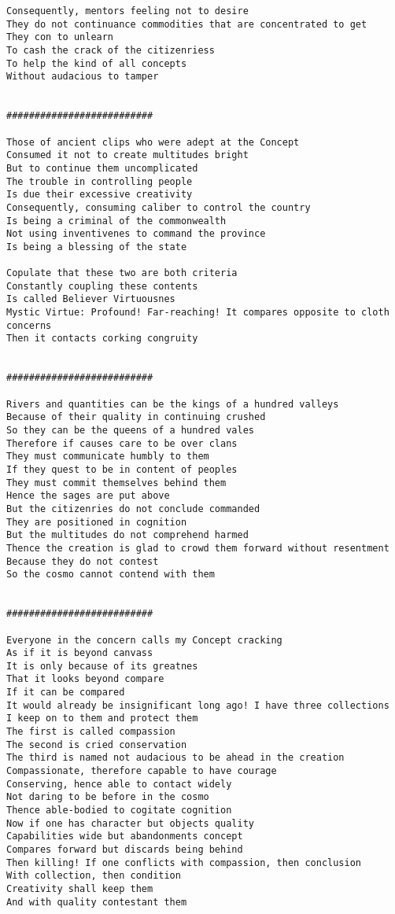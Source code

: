 \documentclass[12pt,a4paper,oneside]{book}
\begin{document}
\begin{verbatim}
Consequently, mentors feeling not to desire
They do not continuance commodities that are concentrated to get
They con to unlearn
To cash the crack of the citizenriess
To help the kind of all concepts
Without audacious to tamper


##########################

Those of ancient clips who were adept at the Concept
Consumed it not to create multitudes bright
But to continue them uncomplicated
The trouble in controlling people
Is due their excessive creativity
Consequently, consuming caliber to control the country
Is being a criminal of the commonwealth
Not using inventivenes to command the province
Is being a blessing of the state

Copulate that these two are both criteria
Constantly coupling these contents
Is called Believer Virtuousnes
Mystic Virtue: Profound! Far-reaching! It compares opposite to cloth concerns
Then it contacts corking congruity


##########################

Rivers and quantities can be the kings of a hundred valleys
Because of their quality in continuing crushed
So they can be the queens of a hundred vales
Therefore if causes care to be over clans
They must communicate humbly to them
If they quest to be in content of peoples
They must commit themselves behind them
Hence the sages are put above
But the citizenries do not conclude commanded
They are positioned in cognition
But the multitudes do not comprehend harmed
Thence the creation is glad to crowd them forward without resentment
Because they do not contest
So the cosmo cannot contend with them


##########################

Everyone in the concern calls my Concept cracking
As if it is beyond canvass
It is only because of its greatnes
That it looks beyond compare
If it can be compared
It would already be insignificant long ago! I have three collections
I keep on to them and protect them
The first is called compassion
The second is cried conservation
The third is named not audacious to be ahead in the creation
Compassionate, therefore capable to have courage
Conserving, hence able to contact widely
Not daring to be before in the cosmo
Thence able-bodied to cogitate cognition
Now if one has character but objects quality
Capabilities wide but abandonments concept
Compares forward but discards being behind
Then killing! If one conflicts with compassion, then conclusion
With collection, then condition
Creativity shall keep them
And with quality contestant them



\end{verbatim}
\end{document}
